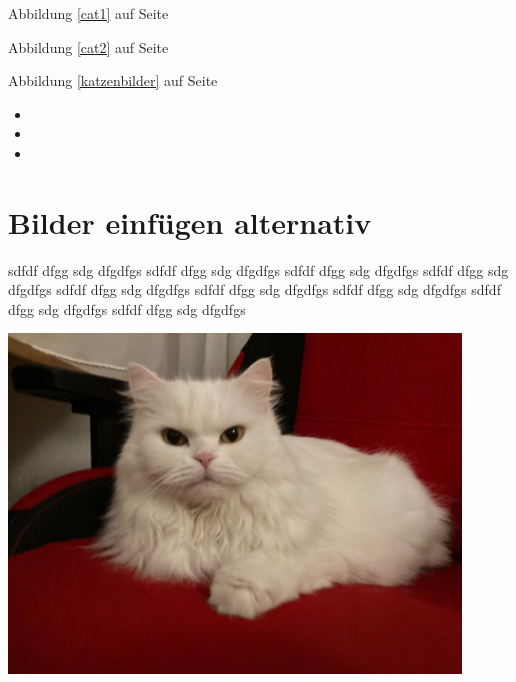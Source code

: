 \documentclass[12pt,ngerman,parskip=half]{scrreprt}
\begin{document}
Abbildung \ref{cat1} auf Seite \pageref{katzenbilder}

Abbildung \ref{cat2} auf Seite \pageref{katzenbilder}

Abbildung \ref{katzenbilder} auf Seite \pageref{katzenbilder}




\the\textwidth

\the\linewidth

\the\columnwidth

\begin{itemize}
	\item \the\textwidth
	\item \the\linewidth
	\item \the\columnwidth
\end{itemize}


\chapter{Bilder einfügen alternativ}

\blindtext  sdfdf dfgg sdg dfgdfgs sdfdf dfgg sdg dfgdfgs sdfdf dfgg sdg dfgdfgs sdfdf dfgg sdg dfgdfgs sdfdf dfgg sdg dfgdfgs sdfdf dfgg sdg dfgdfgs sdfdf dfgg sdg dfgdfgs sdfdf dfgg sdg dfgdfgs sdfdf dfgg sdg dfgdfgs 


\begin{minipage}{\textwidth}
\begin{center}
\includegraphics[width=0.9\textwidth,angle=-5]{Bilder/Katze}
\end{center}
\end{minipage}


\blindtext
\end{document}
